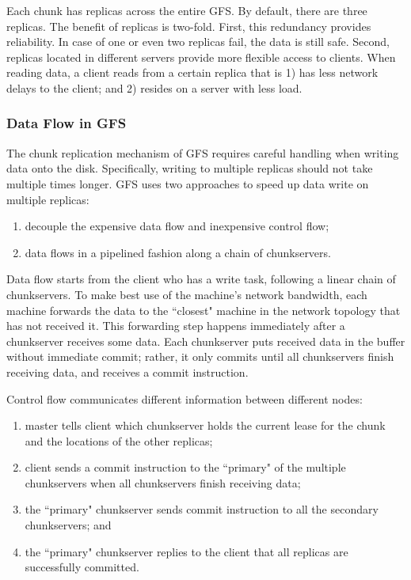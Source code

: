 Each chunk has replicas across the entire GFS.
%
By default, there are three replicas.
%
The benefit of replicas is two-fold.
%
First, this redundancy provides reliability. 
%
In case of one or even two replicas fail, the data is still safe.
%
Second, replicas located in different servers provide more flexible 
access to clients.
%
When reading data, a client reads from a certain replica that is 
1) has less network delays to the client; and
2) resides on a server with less load.

\subsubsection{Data Flow in GFS}
The chunk replication mechanism of GFS requires careful handling 
when writing data onto the disk.
%
Specifically, writing to multiple replicas should not take multiple times longer.
%
GFS uses two approaches to speed up data write on multiple replicas:
%
\begin{enumerate}
\item decouple the expensive data flow and inexpensive control flow;
\item data flows in a pipelined fashion along a chain of chunkservers.
\end{enumerate}

Data flow starts from the client who has a write task, following a linear chain
of chunkservers.
%
To make best use of the machine's network bandwidth, each machine forwards the
data to the ``closest" machine in the network topology that has not received it.
%
This forwarding step happens immediately after a chunkserver receives some data.
%
Each chunkserver puts received data in the buffer without immediate commit;
rather, it only commits until all chunkservers finish receiving data, and 
receives a commit instruction.

Control flow communicates different information between different nodes:
\begin{enumerate}
\item master tells client which chunkserver holds the current lease for 
	the chunk and the locations of the other replicas;
\item client sends a commit instruction to the ``primary" of the multiple
	chunkservers when all chunkservers finish receiving data;
\item the ``primary" chunkserver sends commit instruction to all the secondary
	chunkservers; and
\item the ``primary" chunkserver replies to the client that all replicas are 
	successfully committed.
\end{enumerate}


